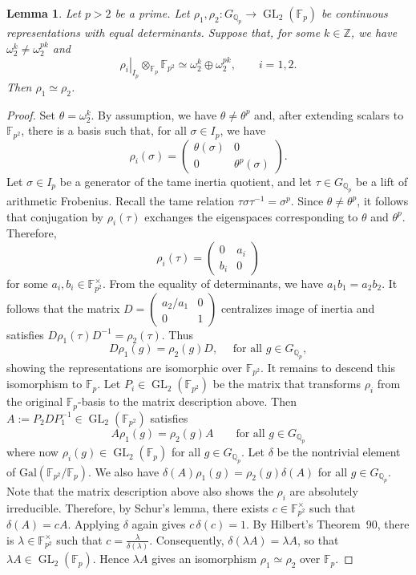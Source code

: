 \documentclass[10pt,a4paper]{amsart}
\theoremstyle{plain}
\newtheorem{lemma}[equation]{Lemma}
\theoremstyle{remark}
\newcommand{\F}{\mathbb{F}}
\DeclareMathOperator{\GL}{GL}
\newcommand{\Gal}{\text{Gal}}
\newcommand{\Q}{\mathbb{Q}}
\newcommand{\Z}{\mathbb{Z}}
\begin{document}
\begin{lemma}\label{lem:niveau-two-representations}
Let $p > 2$ be a prime. Let
$\rho_1,\rho_2:G_{\Q_p}\longrightarrow \GL_2(\F_p)$
be continuous representations with equal determinants.
Suppose that, for some  $k \in \Z$, we have $\omega_2^k\neq\omega_2^{pk}$ and
\[
 \left.\rho_i\right|_{I_p}\otimes_{\F_p}\F_{p^2}
 \simeq
 \omega_2^k\oplus\omega_2^{pk},
 \qquad i=1,2.
\]
Then $\rho_1\simeq\rho_2$.
\end{lemma}

\begin{proof}
Set $\theta=\omega_2^k$. By assumption, we have $\theta\neq\theta^p$ and, after extending scalars to $\F_{p^2}$, there is a basis such that, for all $\sigma \in I_p$, we have
\[
 \rho_i(\sigma)=
 \begin{pmatrix}
  \theta(\sigma)&0\\
  0&\theta^p(\sigma)
 \end{pmatrix}.
\]
Let $\sigma\in I_p$ be a generator of the tame inertia
quotient, and let $\tau\in G_{\Q_p}$ be a lift of arithmetic
Frobenius. Recall the tame relation
$\tau\sigma\tau^{-1}=\sigma^p$. Since $\theta \neq \theta^p$, it follows that conjugation by $\rho_i(\tau)$ exchanges the 
eigenspaces corresponding to $\theta$ and $\theta^p$. Therefore,
\[
 \rho_i(\tau)=
 \begin{pmatrix}
  0&a_i\\
  b_i&0
 \end{pmatrix}
\]
for some $a_i,b_i\in\F_{p^2}^{\times}$. From the equality of determinants, we have $a_1b_1=a_2b_2$.
It follows that the matrix
$
 D=\left(
 \begin{smallmatrix}
  a_2/a_1&0\\
  0&1
 \end{smallmatrix}\right)
$ 
centralizes image of inertia and satisfies
$D\rho_1(\tau)D^{-1}=\rho_2(\tau)$.
Thus
\[
 D\rho_1(g) =  \rho_2(g) D, \quad \text{ for all } g \in G_{\Q_p},
\]
showing the representations are isomorphic over $\F_{p^2}$.
It remains to descend this isomorphism to $\F_p$. 
Let $P_i\in\GL_2(\F_{p^2})$ be the matrix that transforms $\rho_i$ from the original
$\F_p$-basis to the matrix description above. Then
 $A:=P_2DP_1^{-1}\in\GL_2(\F_{p^2})$ satisfies
\[
 A\rho_1(g)=\rho_2(g)A
 \qquad\text{for all }g\in G_{\Q_p}
\]
where now $\rho_i(g) \in \GL_2(\F_p)$ for all $g \in G_{\Q_p}$.
Let $\delta$ be the nontrivial element of
$\Gal(\F_{p^2}/\F_p)$. We also have  $\delta(A)\rho_1(g)=\rho_2(g)\delta(A)$ 
for all $g\in G_{\Q_p}$. 
Note that the matrix description above also shows the $\rho_i$ are absolutely irreducible. Therefore, by Schur's
lemma, there exists $c\in\F_{p^2}^{\times}$ such that
$\delta(A)=cA$. Applying $\delta$ again gives
$c\,\delta(c)=1$. By Hilbert's Theorem~90, there is
$\lambda\in\F_{p^2}^{\times}$ such that
$c=\frac{\lambda}{\delta(\lambda)}$.
Consequently,
$\delta(\lambda A)=\lambda A$,
so that $\lambda A\in\GL_2(\F_p)$. Hence $\lambda A$ gives an
isomorphism $\rho_1\simeq\rho_2$ over $\F_p$.
\end{proof}
\end{document}
